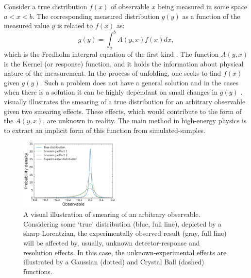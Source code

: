Consider a true distribution $f(x)$ of observable $x$ being measured in some space $a<x<b$.
The corresponding measured distribution $g(y)$ as a function of the measured value $y$ is related to $f(x)$ as:
\begin{equation}\label{eq:fredholm_integral}
    g(y) =  \int_a^b A(y,x) f(x) dx,
\end{equation}
which is the Fredholm intergral equation of the first kind \cite{Blobel_Lohrmann_1998}.
The function $A(y, x)$ is the Kernel (or response) function, and it holds the information about physical nature of the measurement.
In the process of unfolding, one seeks to find $f(x)$ given $g(y)$.
Such a problem does not have a general solution and in the cases when there is a solution it can be highly dependant on small changes in $g(y)$ \cite{Delves_Walsh_1974}.
 visually illustrates the smearing of a true distribution for an arbitrary observable given two smearing effects.
These effects, which would contribute to the form of the $A(y,x)$, are unknown in reality.
The main method in high-energy physics is to extract an implicit form of this function from simulated-samples.

\begin{figure}[htbp!]
    \centering
\includegraphics[width=0.45\textwidth]{figures/analysis_techniques/experimental_smearing.pdf}
\caption{\label{fig:smearing_illustration} A visual illustration of smearing of an arbitrary observable.
Considering some `true' distribution (blue, full line), depicted by a sharp Lorentzian, the experimentally observed result (gray, full line) will be affected by, usually, unknown detector-response and resolution effects.
In this case, the unknown-experimental effects are illustrated by a Gaussian (dotted) and Crystal Ball (dashed) functions.}
\end{figure}

